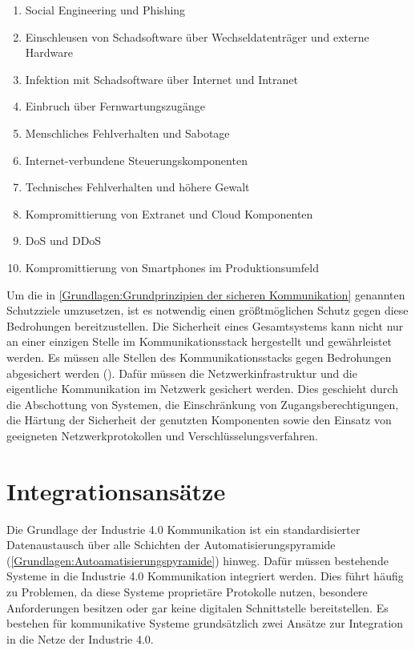 \begin{enumerate}
    \item Social Engineering und Phishing
    \item Einschleusen von Schadsoftware über Wechseldatenträger und externe Hardware
    \item Infektion mit Schadsoftware über Internet und Intranet
    \item Einbruch über Fernwartungszugänge
    \item Menschliches Fehlverhalten und Sabotage
    \item Internet-verbundene Steuerungskomponenten
    \item Technisches Fehlverhalten und höhere Gewalt
    \item Kompromittierung von Extranet und Cloud Komponenten
    \item \ac{DoS} und \ac{DDoS}
    \item Kompromittierung von Smartphones im Produktionsumfeld
\end{enumerate}

Um die in \autoref{Grundlagen:Grundprinzipien der sicheren Kommunikation} genannten Schutzziele umzusetzen, ist es notwendig einen größtmöglichen Schutz gegen diese Bedrohungen bereitzustellen. Die Sicherheit eines Gesamtsystems kann nicht nur an einer einzigen Stelle im Kommunikationsstack hergestellt und gewährleistet werden. Es müssen alle Stellen des Kommunikationsstacks gegen Bedrohungen abgesichert werden (\cite{sichKom2017}). Dafür müssen die Netzwerkinfrastruktur und die eigentliche Kommunikation im Netzwerk gesichert werden. Dies geschieht durch die Abschottung von Systemen, die Einschränkung von Zugangsberechtigungen, die Härtung der Sicherheit der genutzten Komponenten sowie den Einsatz von geeigneten Netzwerkprotokollen und Verschlüsselungsverfahren.

\section{Integrationsansätze}
Die Grundlage der Industrie 4.0 Kommunikation ist ein standardisierter Datenaustausch über alle Schichten der Automatisierungspyramide (\autoref{Grundlagen:Autoamatisierungspyramide}) hinweg. Dafür müssen bestehende Systeme in die Industrie 4.0 Kommunikation integriert werden. Dies führt häufig zu Problemen, da diese Systeme proprietäre Protokolle nutzen, besondere Anforderungen besitzen oder gar keine digitalen Schnittstelle bereitstellen. Es bestehen für kommunikative Systeme grundsätzlich zwei Ansätze zur Integration in die Netze der Industrie 4.0.

